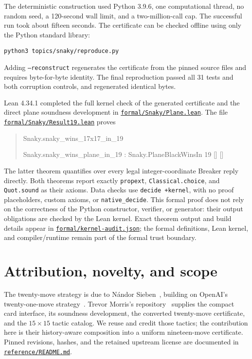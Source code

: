 \documentclass[11pt]{amsart}
\newcommand{\artifact}[2]{\href{https://github.com/shjvandekamp/math/blob/main/topics/snaky/#1}{#2}}
\begin{document}
The deterministic construction used Python 3.9.6, one computational thread,
no random seed, a 120-second wall limit, and a two-million-call cap. The
successful run took about fifteen seconds. The certificate can be checked
offline using only the Python standard library:
\begin{verbatim}
python3 topics/snaky/reproduce.py
\end{verbatim}
Adding \texttt{--reconstruct} regenerates the certificate from the pinned
source files and requires byte-for-byte identity. The final reproduction
passed all 31 tests and both corruption controls, and regenerated identical
bytes.

Lean 4.34.1 completed the full kernel check of the generated certificate and
the direct plane soundness development in
\artifact{formal/Snaky/Plane.lean}{\nolinkurl{formal/Snaky/Plane.lean}}.
The file \artifact{formal/Snaky/Result19.lean}{\nolinkurl{formal/Snaky/Result19.lean}}
proves
\begin{quote}\small\ttfamily
Snaky.snaky\_wins\_17x17\_in\_19\par
Snaky.snaky\_wins\_plane\_in\_19 : Snaky.PlaneBlackWinsIn 19 [] []
\end{quote}
The latter theorem quantifies over every legal integer-coordinate Breaker
reply directly. Both theorems report exactly \texttt{propext},
\texttt{Classical.choice}, and \texttt{Quot.sound} as their axioms. Data checks
use \texttt{decide +kernel}, with no proof placeholders, custom axioms, or
\texttt{native\_decide}. This formal proof does not rely on the correctness of
the Python constructor, verifier, or generator: their output obligations are
checked by the Lean kernel. Exact theorem output and build details appear in
\artifact{formal/kernel-audit.json}{\nolinkurl{formal/kernel-audit.json}};
the formal definitions, Lean kernel, and compiler/runtime remain part of the
formal trust boundary.

\section{Attribution, novelty, and scope}
The twenty-move strategy is due to N\'andor Sieben~\cite{Sieben}, building on
OpenAI's twenty-one-move strategy~\cite{OpenAI}. Trevor Morris's
repository~\cite{Morris} supplies the compact card interface, its soundness
development, the converted twenty-move certificate, and the $15\times15$
tactic catalog. We reuse and credit those tactics; the contribution here is
their history-aware composition into a uniform nineteen-move certificate.
Pinned revisions, hashes, and the retained upstream license are documented in
\artifact{reference/README.md}{\nolinkurl{reference/README.md}}.
\end{document}
